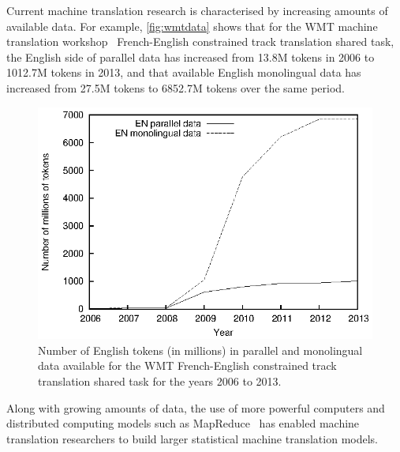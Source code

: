 Current machine translation research is characterised by increasing amounts
of available data. For example, \autoref{fig:wmtdata} shows that
for the WMT machine translation
workshop~\citep{bojar-buck-callisonburch-federmann-haddow-koehn-monz-post-soricut-specia:2013:WMT}
French-English constrained track translation shared task, the English side of parallel
data has increased from 13.8M tokens in 2006 to 1012.7M tokens in 2013, and that
available English monolingual data has increased from 27.5M tokens to 6852.7M
tokens over the same period.
%
\begin{figure}
  \begin{center}
    \includegraphics{figures/wmt/wmtdata.eps}
    \caption{Number of English tokens (in millions) in parallel and monolingual
      data available for the WMT French-English constrained track translation
      shared task for the years 2006 to 2013.}
    \label{fig:wmtdata}
  \end{center}
\end{figure}
%
Along with growing amounts of data, the use of more powerful computers
and distributed computing models such as %
MapReduce~\citep{dean-ghemawat:2008:ACM,lin-dyer:2010:book} has enabled machine
translation researchers to build larger statistical machine translation models.
%
